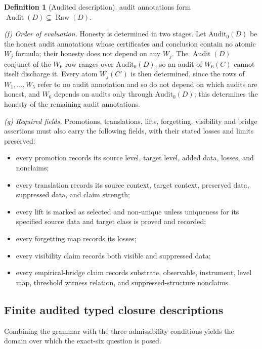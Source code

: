\documentclass[11pt]{article}
\theoremstyle{definition}
\newtheorem{definition}[theorem]{Definition}
\newcommand{\Raw}[1]{\ensuremath{\operatorname{Raw}\!\left(#1\right)}}
\newcommand{\Audit}[1]{\ensuremath{\operatorname{Audit}\!\left(#1\right)}}
\begin{document}
\begin{definition}[Audited description]
audit annotations form \(\Audit{D}\subseteq\Raw{D}\).
\par\emph{(f) Order of evaluation.} Honesty is determined in
two stages. Let \(\mathrm{Audit}_0(D)\) be the honest audit annotations whose
certificates and conclusion contain no atomic \(W_j\) formula; their honesty
does not depend on any \(W_j\). The \(\Audit{D}\) conjunct of the \(W_6\) row
ranges over \(\mathrm{Audit}_0(D)\), so an audit of \(W_6(C)\) cannot itself
discharge it. Every atom \(W_j(C')\) is then determined, since
the rows of \(W_1,\dots,W_5\) refer to no audit annotation and so do not depend
on which audits are honest, and \(W_6\) depends on audits only through
\(\mathrm{Audit}_0(D)\); this determines the
honesty of the remaining audit annotations.
\par\emph{(g) Required fields.} Promotions,
translations, lifts, forgetting, visibility and bridge assertions must also
carry the following fields, with their stated losses and limits preserved:
\begin{itemize}[topsep=2pt,itemsep=1pt]
  \item every promotion records its source level, target level, added data,
    losses, and nonclaims;
  \item every translation records its source context, target context,
    preserved data, suppressed data, and claim strength;
  \item every lift is marked as selected and non-unique unless uniqueness for its specified source data and target class is proved and recorded;
  \item every forgetting map records its losses;
  \item every visibility claim records both visible and suppressed data;
  \item every empirical-bridge claim records substrate, observable,
    instrument, level map, threshold witness relation, and
    suppressed-structure nonclaims.
\end{itemize}
\end{definition}

\subsection{Finite audited typed closure descriptions}\label{subsec:fatcd}

Combining the grammar with the three admissibility conditions yields
the domain over which the exact-six question is posed.
\end{document}
